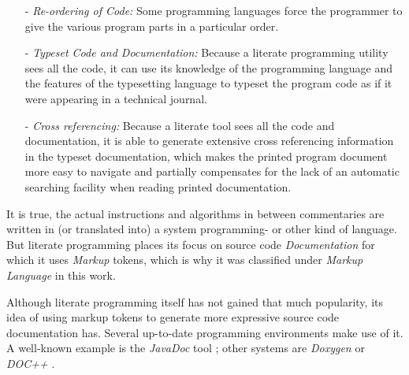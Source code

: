 \begin{itemize}
    \item[-] \emph{Re-ordering of Code:} Some programming languages force the
        programmer to give the various program parts in a particular order.
    \item[-] \emph{Typeset Code and Documentation:} Because a literate programming
        utility sees all the code, it can use its knowledge of the programming
        language and the features of the typesetting language to typeset the
        program code as if it were appearing in a technical journal.
    \item[-] \emph{Cross referencing:} Because a literate tool sees all the code
        and documentation, it is able to generate extensive cross referencing
        information in the typeset documentation, which makes the printed program
        document more easy to navigate and partially compensates for the lack of
        an automatic searching facility when reading printed documentation.
\end{itemize}

It is true, the actual instructions and algorithms in between commentaries are
written in (or translated into) a system programming- or other kind of language.
But literate programming places its focus on source code \emph{Documentation}
for which it uses \emph{Markup} tokens, which is why it was classified under
\emph{Markup Language} in this work.

Although literate programming itself has not gained that much popularity, its
idea of using markup tokens to generate more expressive source code documentation
has. Several up-to-date programming environments make use of it. A well-known
example is the \emph{JavaDoc} tool \cite{javadoc}; other systems are
\emph{Doxygen} \cite{doxygen} or \emph{DOC++} \cite{docpp}.
